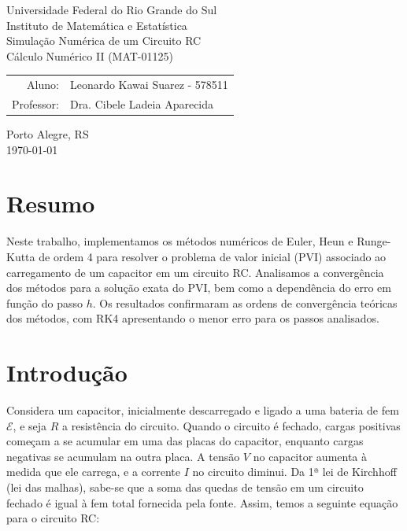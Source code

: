 \documentclass[11pt]{article}
\begin{document}
\nocite{*}

\begin{center}
    \large Universidade Federal do Rio Grande do Sul \\
    \large Instituto de Matemática e Estatística \\
    \vspace{4cm}
    \huge Simulação Numérica de um Circuito RC \\
    \vspace{1cm}
    \Large Cálculo Numérico II (MAT-01125)  \\
    \vspace{4cm}

    \large\begin{tabular}{rl}
        Aluno: & Leonardo Kawai Suarez - 578511 \\
        Professor: & Dra. Cibele Ladeia Aparecida \\
    \end{tabular}

    \vfill
    \large Porto Alegre, RS \\
    \large \today
\end{center}

\newpage
\tableofcontents

\section{Resumo}

Neste trabalho, implementamos os métodos numéricos de Euler, Heun e Runge-Kutta de ordem 4 para resolver o problema de valor inicial (PVI) associado ao carregamento de um capacitor em um circuito RC. Analisamos a convergência dos métodos para a solução exata do PVI, bem como a dependência do erro em função do passo \(h\). Os resultados confirmaram as ordens de convergência teóricas dos métodos, com RK4 apresentando o menor erro para os passos analisados.

\section{Introdução}

Considera um capacitor, inicialmente descarregado e ligado a uma bateria de fem \(\mathcal{E}\), e seja \(R\) a resistência do circuito. Quando o circuito é fechado, cargas positivas começam a se acumular em uma das placas do capacitor, enquanto cargas negativas se acumulam na outra placa. A tensão \(V\) no capacitor aumenta à medida que ele carrega, e a corrente \(I\) no circuito diminui. Da 1ª lei de Kirchhoff (lei das malhas), sabe-se que a soma das quedas de tensão em um circuito fechado é igual à fem total fornecida pela fonte. Assim, temos a seguinte equação para o circuito RC:
\end{document}
